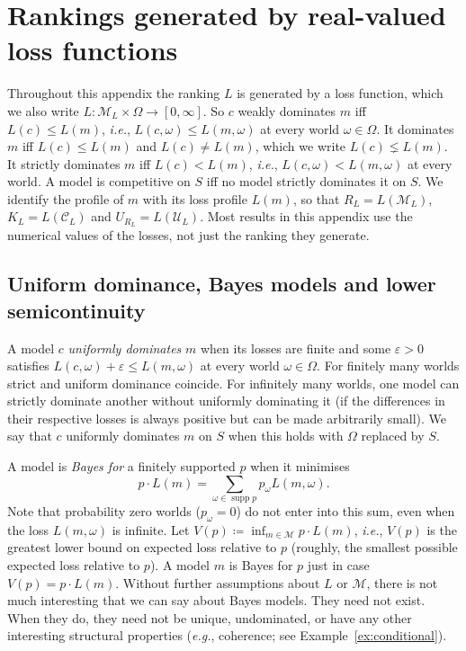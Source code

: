 \documentclass[11pt]{article}
\theoremstyle{definition}
\theoremstyle{remark}
\newcommand{\M}{\mathcal M}
\newcommand{\C}{\mathcal C}
\newcommand{\U}{\mathcal U}
\newcommand{\supp}{\operatorname{supp}}
\begin{document}
\appendix
\section{Rankings generated by real-valued loss functions}\label{sec:real}
Throughout this appendix the ranking $L$ is generated by a loss function, which we also write $L:\M_L\times\Omega\to[0,\infty]$. So $c$ weakly dominates $m$ iff $L(c)\le L(m)$, \textit{i.e.}, $L(c,\omega)\le L(m,\omega)$ at every world $\omega\in\Omega$. It dominates $m$ iff $L(c)\le L(m)$ and $L(c)\neq L(m)$, which we write $L(c)\lneq L(m)$. It strictly dominates $m$ iff $L(c)<L(m)$, \textit{i.e.}, $L(c,\omega)<L(m,\omega)$ at every world. A model is competitive on $S$ iff no model strictly dominates it on $S$. We identify the profile of $m$ with its loss profile $L(m)$, so that $R_L=L(\M_L)$, $K_L=L(\C_L)$ and $U_{R_L}=L(\U_L)$. Most results in this appendix use the numerical values of the losses, not just the ranking they generate.

\subsection{Uniform dominance, Bayes models and lower semicontinuity}\label{sec:ordinal}
A model $c$ \emph{uniformly dominates} $m$ when its losses are finite and some $\varepsilon>0$ satisfies $L(c,\omega)+\varepsilon\le L(m,\omega)$ at every world $\omega\in\Omega$. For finitely many worlds strict and uniform dominance coincide. For infinitely many worlds, one model can strictly dominate another without uniformly dominating it (if the differences in their respective losses is always positive but can be made arbitrarily small). We say that $c$ uniformly dominates $m$ on $S$ when this holds with $\Omega$ replaced by $S$.

A model is \emph{Bayes for} a finitely supported $p$ when it minimises
\[
 p\cdot L(m)=\sum_{\omega\in\supp p}p_\omega L(m,\omega).
\]
Note that probability zero worlds ($p_\omega=0$) do not enter into this sum, even when the loss $L(m,\omega)$ is infinite. Let $V(p)\coloneqq \inf_{m\in\M}p\cdot L(m)$, \textit{i.e.}, $V(p)$ is the greatest lower bound on expected loss relative to $p$ (roughly, the smallest possible expected loss relative to $p$). A model $m$ is Bayes for $p$ just in case $V(p)=p\cdot L(m)$. Without further assumptions about $L$ or $\M$, there is not much interesting that we can say about Bayes models. They need not exist. When they do, they need not be unique, undominated, or have any other interesting structural properties (\textit{e.g.}, coherence; see Example~\ref{ex:conditional}).
\end{document}
